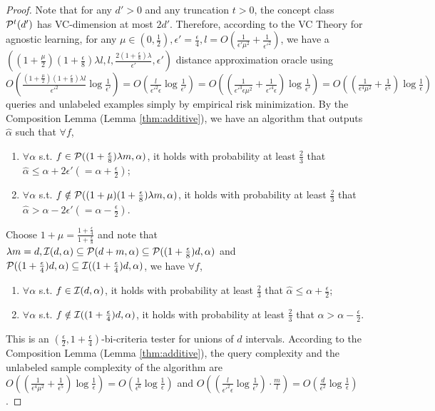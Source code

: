 \begin{proof}
Note that for any $d'>0$ and any truncation $t>0$, the concept class ${\mathcal{P}}^{t}(d')$ has VC-dimension at most $2d'$. Therefore, according to the VC Theory for agnostic learning, for any $\mu\in(0,\frac{1}{2}),\epsilon'=\frac\epsilon 4,l=O(\frac{1}{\epsilon'\mu^2}+\frac{1}{\epsilon'^2})$, we have a $((1+\frac{\mu}{2})(1+\frac{\epsilon}{8})\lambda l,l,\frac{2(1+\frac{\epsilon}{8})\lambda}{\epsilon'},\epsilon')$ distance approximation oracle using $O(\frac{(1+\frac{\mu}{2})(1+\frac{\epsilon}{8})\lambda l}{{\epsilon'}^2}\log\frac{1}{\epsilon'})=O(\frac{l}{\epsilon'^2\epsilon}\log\frac{1}{\epsilon'})=O((\frac{1}{\epsilon'^3\epsilon\mu^2}+\frac{1}{\epsilon'^4\epsilon})\log\frac{1}{\epsilon'})=O((\frac 1{\epsilon^4\mu^2}+\frac 1{\epsilon^5})\log\frac 1\epsilon)$ queries and unlabeled examples simply by empirical risk minimization. By the Composition Lemma (Lemma \ref{thm:additive}), we have an algorithm that outputs $\hat\alpha$ such that $\forall f$,
\begin{enumerate}
\item $\forall \alpha$ s.t. $f\in{\mathcal{P}}((1+\frac{\epsilon}{8})\lambda m,\alpha)$, it holds with probability at least $\frac{2}{3}$ that $\hat\alpha\leq\alpha+2\epsilon'(=\alpha+\frac\epsilon 2)$;
\item $\forall \alpha$ s.t. $f\notin{\mathcal{P}}((1+\mu)(1+\frac{\epsilon}{8})\lambda m,\alpha)$, it holds with probability at least $\frac{2}{3}$ that $\hat\alpha>\alpha-2\epsilon'(=\alpha-\frac\epsilon 2)$.
\end{enumerate}

Choose $1+\mu=\frac{1+\frac{\epsilon}{4}}{1+\frac{\epsilon}{8}}$ and note that $\lambda m=d,{\mathcal{I}}(d,\alpha)\subseteq{\mathcal{P}}(d+m,\alpha)\subseteq{\mathcal{P}}((1+\frac{\epsilon}{8})d,\alpha)$ and ${\mathcal{P}}((1+\frac{\epsilon}{4})d,\alpha)\subseteq {\mathcal{I}}((1+\frac{\epsilon}{4})d,\alpha)$, we have $\forall f$,
\begin{enumerate}
\item $\forall \alpha$ s.t. $f\in{\mathcal{I}}(d,\alpha)$, it holds with probability at least $\frac{2}{3}$ that $\hat\alpha\leq\alpha+\frac\epsilon 2$;
\item $\forall \alpha$ s.t. $f\notin{\mathcal{I}}((1+\frac{\epsilon}{4})d,\alpha)$, it holds with probability at least $\frac{2}{3}$ that $\hat\alpha>\alpha-\frac \epsilon 2$.
\end{enumerate}

This is an $(\frac \epsilon 2,1+\frac{\epsilon}{4})$-bi-criteria tester for unions of $d$ intervals. According to the Composition Lemma (Lemma \ref{thm:additive}), the query complexity and the unlabeled sample complexity of the algorithm are $O((\frac{1}{\epsilon^4\mu^2}+\frac{1}{\epsilon^5})\log\frac{1}{\epsilon})=O(\frac{1}{\epsilon^6}\log\frac{1}{\epsilon})$ and $O((\frac{l}{\epsilon'^2\epsilon}\log\frac{1}{\epsilon'})\cdot\frac{m}{l})=O(\frac{d}{\epsilon^2}\log\frac{1}{\epsilon})$.


\end{proof}
